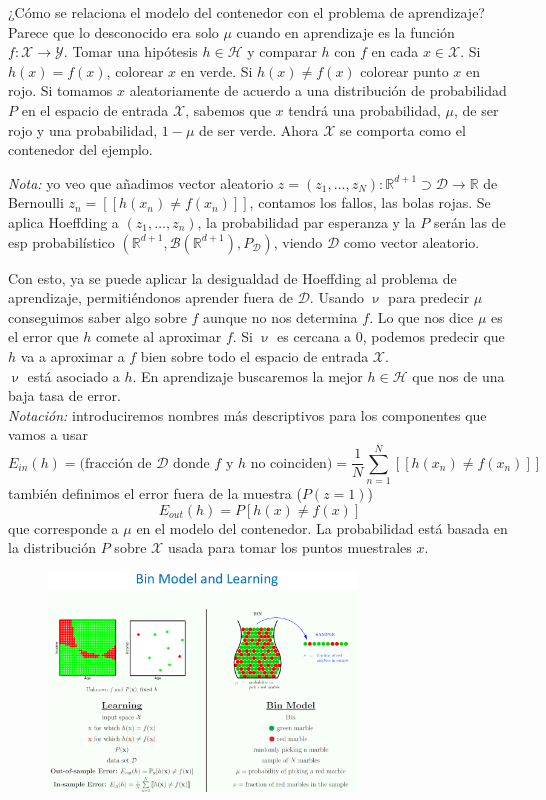 \documentclass[11pt,a4paper]{article}
\theoremstyle{definition}
\newcommand{\R}{\mathbb{R}}
\begin{document}
	¿Cómo se relaciona el modelo del contenedor con el problema de aprendizaje? Parece que lo desconocido era solo $\mu$ cuando en aprendizaje es la función $f\colon \mathcal{X} \to \mathcal{Y}$. Tomar una hipótesis $h\in \mathcal{H}$ y comparar $h$ con $f$ en cada $x\in \mathcal{X}$. Si $h(x)=f(x)$, colorear $x$ en verde. Si $h(x)\neq f(x)$ colorear punto $x$ en rojo. Si tomamos $x$ aleatoriamente de acuerdo a una distribución de probabilidad $P$ en el espacio de entrada $\mathcal{X}$, sabemos que $x$ tendrá una probabilidad, $\mu$, de ser rojo y una probabilidad, $1-\mu$ de ser verde. Ahora $\mathcal{X}$ se comporta como el contenedor del ejemplo.
	
	\textit{Nota:} yo veo que añadimos vector aleatorio $z=(z_1,\ldots, z_N)\colon  \R^{d+1}\supset \mathcal{D} \to \R$ de Bernoulli $z_n=[[h(x_n)\neq f(x_n)]]$, contamos los fallos, las bolas rojas. Se aplica Hoeffding a $(z_1,\ldots, z_n)$, la probabilidad par esperanza y la $P$ serán las de esp probabilístico $(\R^{d+1}, \mathcal{B}(\R^{d+1}), P_\mathcal{D})$, viendo $\mathcal{D}$ como vector aleatorio.
	
	Con esto, ya se puede aplicar la desigualdad de Hoeffding al problema de aprendizaje, permitiéndonos aprender fuera de $\mathcal{D}$. Usando $\upnu$ para predecir $\mu$ conseguimos saber algo sobre $f$ aunque no nos determina $f$. Lo que nos dice $\mu$ es el error que $h$ comete al aproximar $f$. Si $\upnu$ es cercana a 0, podemos predecir que $h$ va a aproximar a $f$ bien sobre todo el espacio de entrada $\mathcal{X}$.\\
	$\upnu$ está asociado a $h$. En aprendizaje buscaremos la mejor $h\in \mathcal{H}$ que nos de una baja tasa de error.\\
	
	\textit{Notación:} introduciremos nombres más descriptivos para los componentes que vamos a usar
	$$E_{in}(h) = \text{(fracción de } \mathcal{D} \text{ donde } f \text{ y } h \text{ no coinciden)}=\frac{1}{N} \sum_{n=1}^N [[h(x_n) \neq f(x_n)]]$$
	también definimos el error fuera de la muestra ($P(z=1)$)
	$$E_{out}(h)=P[h(x)\neq f(x)]$$
	que corresponde a $\mu$ en el modelo del contenedor. La probabilidad está basada en la distribución $P$ sobre $\mathcal{X}$ usada para tomar los puntos muestrales $x$. 
	
	
	\begin{figure}[H]
		\centering
		\includegraphics[width=0.73\textwidth]{images/bin_model_and_learning}
	\end{figure}
	
\end{document}
